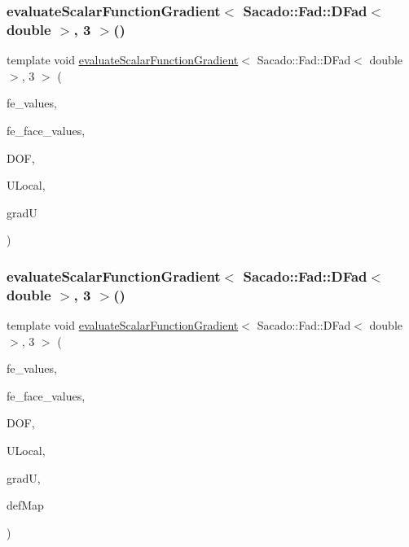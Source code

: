 \subsubsection{\texorpdfstring{evaluateScalarFunctionGradient$<$ Sacado::Fad::DFad$<$ double $>$, 3 $>$()}{evaluateScalarFunctionGradient< Sacado::Fad::DFad< double >, 3 >()}\hspace{0.1cm}{\footnotesize\ttfamily [3/4]}}
{\footnotesize\ttfamily template void \mbox{\hyperlink{group___evaluation_functions_gabedd4ae2841d2332ed0df0513b189e34}{evaluate\+Scalar\+Function\+Gradient}}$<$ Sacado\+::\+Fad\+::\+D\+Fad$<$ double $>$, 3 $>$ (\begin{DoxyParamCaption}\item[{const F\+E\+Values$<$ 3 $>$ \&}]{fe\+\_\+values,  }\item[{const F\+E\+Face\+Values$<$ 3 $>$ \&}]{fe\+\_\+face\+\_\+values,  }\item[{unsigned int}]{D\+OF,  }\item[{Table$<$ 1, Sacado\+::\+Fad\+::\+D\+Fad$<$ double $>$$>$ \&}]{U\+Local,  }\item[{Table$<$ 2, Sacado\+::\+Fad\+::\+D\+Fad$<$ double $>$$>$ \&}]{gradU }\end{DoxyParamCaption})}

\mbox{\label{function_evaluations_8cc_a28b649ef8b832ed57cd596b5a68d62c2}} 
\subsubsection{\texorpdfstring{evaluateScalarFunctionGradient$<$ Sacado::Fad::DFad$<$ double $>$, 3 $>$()}{evaluateScalarFunctionGradient< Sacado::Fad::DFad< double >, 3 >()}\hspace{0.1cm}{\footnotesize\ttfamily [4/4]}}
{\footnotesize\ttfamily template void \mbox{\hyperlink{group___evaluation_functions_gabedd4ae2841d2332ed0df0513b189e34}{evaluate\+Scalar\+Function\+Gradient}}$<$ Sacado\+::\+Fad\+::\+D\+Fad$<$ double $>$, 3 $>$ (\begin{DoxyParamCaption}\item[{const F\+E\+Values$<$ 3 $>$ \&}]{fe\+\_\+values,  }\item[{const F\+E\+Face\+Values$<$ 3 $>$ \&}]{fe\+\_\+face\+\_\+values,  }\item[{unsigned int}]{D\+OF,  }\item[{Table$<$ 1, Sacado\+::\+Fad\+::\+D\+Fad$<$ double $>$$>$ \&}]{U\+Local,  }\item[{Table$<$ 2, Sacado\+::\+Fad\+::\+D\+Fad$<$ double $>$$>$ \&}]{gradU,  }\item[{\mbox{\hyperlink{structdeformation_map}{deformation\+Map}}$<$ Sacado\+::\+Fad\+::\+D\+Fad$<$ double $>$, 3 $>$ \&}]{def\+Map }\end{DoxyParamCaption})}

